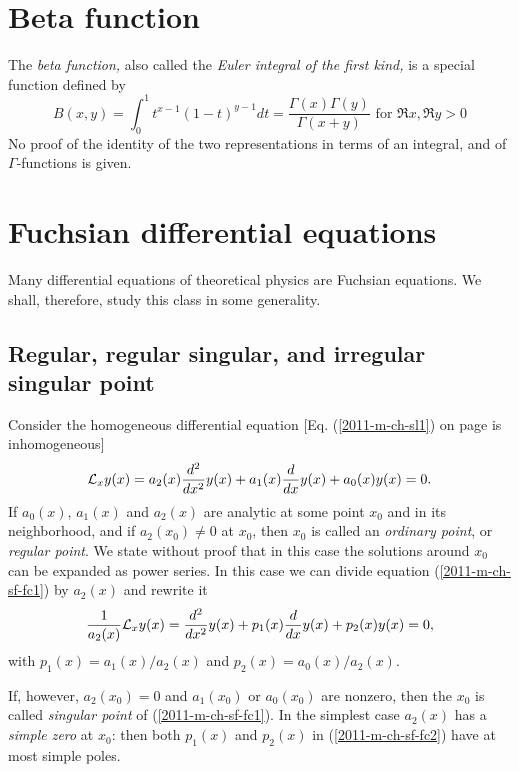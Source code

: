 \section{Beta function}
The  {\em beta function,}
also called the  {\em Euler integral of the first kind,} is a special function defined by
\begin{equation}
B(x,y)=\int_0^1 t^{x-1}(1-t)^{y-1} dt =\frac{\Gamma (x) \Gamma (y)}{\Gamma (x+y)} \textrm{ for } \Re x, \Re y >0
\label{2011-m-ch-sf-beta}
\end{equation}
No proof of the identity of the two representations in terms of an integral, and of $\Gamma$-functions is given.


\section{Fuchsian differential equations}

Many differential equations of theoretical physics are Fuchsian equations.
We shall, therefore, study this class in some generality.


\subsection{Regular,  regular singular, and irregular singular point}
Consider the homogeneous differential equation   [Eq. (\ref{2011-m-ch-sl1}) on page \pageref{2011-m-ch-sl1} is inhomogeneous]
\begin{equation}
{\cal L}_x y(x) =   a_2(x) \frac{d^2}{dx^2}y(x)  +  a_1(x) \frac{d}{dx}y(x)+   a_0(x) y(x)
 =
0.
\label{2011-m-ch-sf-fc1}
\end{equation}
If $a_0(x)$, $a_1(x)$ and $a_2(x)$ are analytic at some point $x_0$ and in its neighborhood,
and if $a_2(x_0)\neq 0$
at $x_0$, then
 $x_0$
is called an {\em ordinary point}, or {\em regular point}.
We  state without proof that in this case the solutions around $x_0$ can be expanded as power series.
In this case we can  divide equation (\ref{2011-m-ch-sf-fc1}) by $a_2(x)$ and rewrite it
\begin{equation}
\frac{1}{a_2(x)}{\cal L}_x y(x) =   \frac{d^2}{dx^2}y(x) +   p_1  (x)    \frac{d}{dx}y(x)+    p_2  (x)   y(x)
 =
0,
\label{2011-m-ch-sf-fc2}
\end{equation}
with
$  p_1  (x)  =    a_1(x) / a_2(x)
$
and
$ p_2 (x) =     a_0(x) / a_2(x)
$.

If, however, $a_2(x_0)= 0$ and $a_1(x_0)$ or $a_0(x_0)$ are nonzero, then the $x_0$ is called
{\em singular point}
 of (\ref{2011-m-ch-sf-fc1}).
In the simplest case $a_2(x)$ has a {\em simple zero} at $x_0$:
then both $  p_1  (x)  $ and $  p_2  (x)  $
in (\ref{2011-m-ch-sf-fc2})
have at most simple poles.


